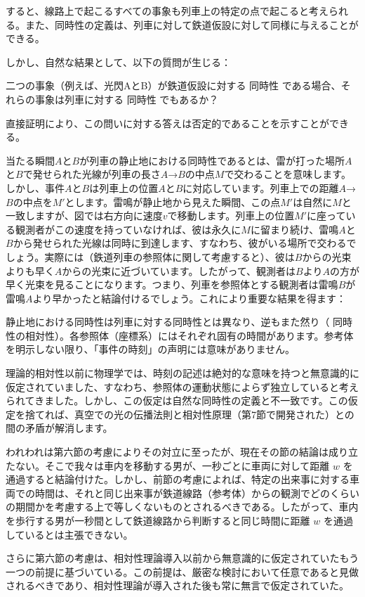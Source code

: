 \documentclass[a4paper,11pt,openany]{ltjsbook}
\begin{document}
すると、線路上で起こるすべての事象も列車上の特定の点で起こると考えられる。また、同時性の定義は、列車に対して鉄道仮設に対して同様に与えることができる。

しかし、自然な結果として、以下の質問が生じる：

二つの事象（例えば、光閃AとB）が鉄道仮設に対する 同時性 である場合、それらの事象は列車に対する 同時性 でもあるか？

直接証明により、この問いに対する答えは否定的であることを示すことができる。

当たる瞬間$A$と$B$が列車の静止地における同時性であるとは、雷が打った場所$A$と$B$で発せられた光線が列車の長さ$A$→$B$の中点$M$で交わることを意味します。しかし、事件$A$と$B$は列車上の位置$A$と$B$に対応しています。列車上での距離$A$→$B$の中点を$M′$とします。雷鳴が静止地から見えた瞬間、この点$M′$は自然に$M$と一致しますが、図では右方向に速度$v$で移動します。列車上の位置$M′$に座っている観測者がこの速度を持っていなければ、彼は永久に$M$に留まり続け、雷鳴$A$と$B$から発せられた光線は同時に到達します、すなわち、彼がいる場所で交わるでしょう。実際には（鉄道列車の参照体に関して考慮すると）、彼は$B$からの光束よりも早く$A$からの光束に近づいています。したがって、観測者は$B$より$A$の方が早く光束を見ることになります。つまり、列車を参照体とする観測者は雷鳴$B$が雷鳴$A$より早かったと結論付けるでしょう。これにより重要な結果を得ます：

静止地における同時性は列車に対する同時性とは異なり、逆もまた然り（ 同時性の相対性）。各参照体（座標系）にはそれぞれ固有の時間があります。参考体を明示しない限り、「事件の時刻」の声明には意味がありません。

理論的相対性以前に物理学では、時刻の記述は絶対的な意味を持つと無意識的に仮定されていました、すなわち、参照体の運動状態によらず独立していると考えられてきました。しかし、この仮定は自然な同時性の定義と不一致です。この仮定を捨てれば、真空での光の伝播法則と相対性原理（第7節で開発された）との間の矛盾が解消します。

われわれは第六節の考慮によりその対立に至ったが、現在その節の結論は成り立たない。そこで我々は車内を移動する男が、一秒ごとに車両に対して距離 $w$ を通過すると結論付けた。しかし、前節の考慮によれば、特定の出来事に対する車両での時間は、それと同じ出来事が鉄道線路（参考体）からの観測でどのくらいの期間かを考慮する上で等しくないものとされるべきである。したがって、車内を歩行する男が一秒間として鉄道線路から判断すると同じ時間に距離 $w$ を通過しているとは主張できない。

さらに第六節の考慮は、相対性理論導入以前から無意識的に仮定されていたもう一つの前提に基づいている。この前提は、厳密な検討において任意であると見做されるべきであり、相対性理論が導入された後も常に無言で仮定されていた。
\end{document}
